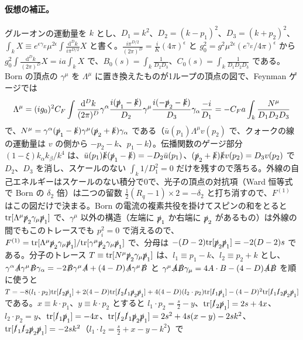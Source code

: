 \documentclass[a4paper,10pt]{ltjsarticle}
\newcommand{\dd}{\mathrm{d}}
\newcommand{\tr}{\mathrm{tr}}
\begin{document}
\paragraph{仮想の補正。}グルーオンの運動量を $k$ とし、$D_1=k^2$、$D_2=(k-p_1)^2$、$D_3=(k+p_2)^2$、$\int_kX\equiv e^{\epsilon\gamma_E}\mu^{2\epsilon}\int\frac{\dd^Dk}{i\pi^{D/2}}X$ と書く。$\frac{i\pi^{D/2}}{(2\pi)^D}=\frac iK(4\pi)^\epsilon$ と $g_0^2=g^2\mu^{2\epsilon}(e^{\gamma_E}/4\pi)^\epsilon$ から $g_0^2\int\frac{\dd^Dk}{(2\pi)^D}X=ia\int_kX$ で、$B_0(s)=\int_k\frac1{D_2D_3}$、$C_0(s)=\int_k\frac1{D_1D_2D_3}$ である。Born の頂点の $\gamma^\mu$ を $\Lambda^\mu$ に置き換えたものが1ループの頂点の図で、Feynman ゲージでは
\begin{equation*}
\Lambda^\mu=(ig_0)^2C_F\int\frac{\dd^Dk}{(2\pi)^D}\gamma^\alpha\frac{i(\slashed p_1-\slashed k)}{D_2}\gamma^\mu\frac{i(-\slashed p_2-\slashed k)}{D_3}\gamma_\alpha\frac{-i}{D_1}=-C_Fa\int_k\frac{N^\mu}{D_1D_2D_3}
\end{equation*}
で、$N^\mu=\gamma^\alpha(\slashed p_1-\slashed k)\gamma^\mu(\slashed p_2+\slashed k)\gamma_\alpha$ である（$\bar u(p_1)\Lambda^\mu v(p_2)$ で、クォークの線の運動量は $v$ の側から $-p_2-k$、$p_1-k$）。伝播関数のゲージ部分 $(1-\xi)k_\alpha k_\beta/k^4$ は、$\bar u(p_1)\slashed k(\slashed p_1-\slashed k)=-D_2\bar u(p_1)$、$(\slashed p_2+\slashed k)\slashed kv(p_2)=D_3v(p_2)$ で $D_2$、$D_3$ を消し、スケールのない $\int_k1/D_1^2=0$ だけを残すので落ちる。外線の自己エネルギーはスケールのない積分で0で、光子の頂点の対抗項（Ward 恒等式で Born の $\delta_2$ 倍）は二つの留数 $\frac12(R_q-1)\times2=-\delta_2$ と打ち消すので、$F^{(1)}$ はこの図だけで決まる。Born の電流の複素共役を掛けてスピンの和をとると $\tr[\Lambda^\mu\slashed p_2\gamma_\mu\slashed p_1]$ で、$\gamma^\mu$ 以外の構造（左端に $\slashed p_1$ か右端に $\slashed p_2$ があるもの）は外線の間でもこのトレースでも $p_i^2=0$ で消えるので、$F^{(1)}=\tr[\Lambda^\mu\slashed p_2\gamma_\mu\slashed p_1]/\tr[\gamma^\mu\slashed p_2\gamma_\mu\slashed p_1]$ で、分母は $-(D-2)\tr[\slashed p_2\slashed p_1]=-2(D-2)s$ である。分子のトレース $T\equiv\tr[N^\mu\slashed p_2\gamma_\mu\slashed p_1]$ は、$l_1\equiv p_1-k$、$l_2\equiv p_2+k$ とし、$\gamma^\alpha\slashed A\gamma^\mu\slashed B\gamma_\alpha=-2\slashed B\gamma^\mu\slashed A+(4-D)\slashed A\gamma^\mu\slashed B$ と $\gamma^\mu\slashed A\slashed B\gamma_\mu=4A\cdot B-(4-D)\slashed A\slashed B$ を順に使うと $T=-8(l_1\cdot p_2)\tr[\slashed l_2\slashed p_1]+2(4-D)\tr[\slashed l_2\slashed l_1\slashed p_2\slashed p_1]+4(4-D)(l_2\cdot p_2)\tr[\slashed l_1\slashed p_1]-(4-D)^2\tr[\slashed l_1\slashed l_2\slashed p_2\slashed p_1]$ である。$x\equiv k\cdot p_1$、$y\equiv k\cdot p_2$ とすると $l_1\cdot p_2=\frac s2-y$、$\tr[\slashed l_2\slashed p_1]=2s+4x$、$l_2\cdot p_2=y$、$\tr[\slashed l_1\slashed p_1]=-4x$、$\tr[\slashed l_2\slashed l_1\slashed p_2\slashed p_1]=2s^2+4s(x-y)-2sk^2$、$\tr[\slashed l_1\slashed l_2\slashed p_2\slashed p_1]=-2sk^2$（$l_1\cdot l_2=\frac s2+x-y-k^2$）で
\end{document}
